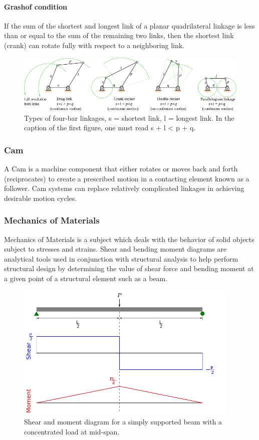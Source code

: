 \paragraph{Grashof condition} If the sum of the shortest and longest link of a planar quadrilateral linkage is less than or equal to the sum of the remaining two links, then the shortest link (crank) can rotate fully with respect to a neighboring link.
\begin{figure}
  \centering
  \includegraphics[width=4.5in]{fig/800px-Linkage_four_bar.svg.png}
  \caption{Types of four-bar linkages, s = shortest link, l = longest link. In the caption of the first figure, one must read s + l < p + q.}\label{fig_four_bar_linkage}
\end{figure}

\subsubsection{Cam}
A Cam is a machine component that either rotates or moves back and forth (reciprocates) to create a prescribed motion in a contacting element known as a follower. Cam systems can replace relatively complicated linkages in achieving desirable motion cycles.

\subsubsection{Mechanics of Materials}
Mechanics of Materials is a subject which deals with the behavior of solid objects subject to stresses and strains. Shear and bending moment diagrams are analytical tools used in conjunction with structural analysis to help perform structural design by determining the value of shear force and bending moment at a given point of a structural element such as a beam.

\begin{figure}
  \centering
  \includegraphics[width=4.2in]{fig/Shear_Moment_Diagram.svg.png}
  \caption{Shear and moment diagram for a simply supported beam with a concentrated load at mid-span.}\label{fig_Shear_Moment_Diagram}
\end{figure}

